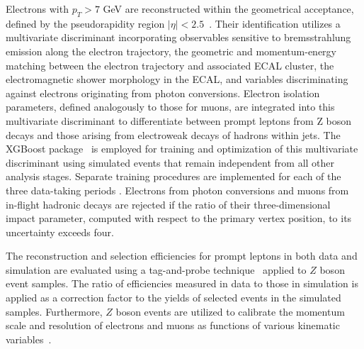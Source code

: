 Electrons with $p_T>7$ GeV are reconstructed within the geometrical acceptance, defined by the pseudorapidity region $|\eta|<2.5$~\cite{eleReco}. Their identification utilizes a multivariate discriminant incorporating observables sensitive to bremsstrahlung emission along the electron trajectory, the geometric and momentum-energy matching between the electron trajectory and associated ECAL cluster, the electromagnetic shower morphology in the ECAL, and variables discriminating against electrons originating from photon conversions. Electron isolation parameters, defined analogously to those for muons, are integrated into this multivariate discriminant to differentiate between prompt leptons from Z boson decays and those arising from electroweak decays of hadrons within jets. The XGBoost package~\cite{xgboost} is employed for training and optimization of this multivariate discriminant using simulated events that remain independent from all other analysis stages. Separate training procedures are implemented for each of the three data-taking periods \cite{ElectronBDT}. Electrons from photon conversions and muons from in-flight hadronic decays are rejected if the ratio of their three-dimensional impact parameter, computed with respect to the primary vertex position, to its uncertainty exceeds four.

The reconstruction and selection efficiencies for prompt leptons in both data and simulation are evaluated using a tag-and-probe technique~\cite{CMS:2011aa} applied to $Z$ boson event samples. The ratio of efficiencies measured in data to those in simulation is applied as a correction factor to the yields of selected events in the simulated samples.
Furthermore, $Z$ boson events are utilized to calibrate the momentum scale and resolution of electrons and muons as functions of various kinematic variables~\cite{ScaleSmear2, Roch2}.

